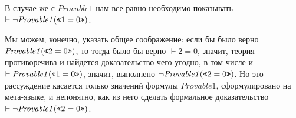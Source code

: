 В случае же с $\mathit{Provable1}$ нам все равно необходимо показывать $\vdash \neg \mathit{Provable1} (\texttt{<<}1=0\texttt{>>})$.

Мы можем, конечно, указать общее соображение: если бы было верно $\mathit{Provable1} (\texttt{<<}2=0\texttt{>>})$, то 
тогда было бы верно $\vdash 2=0$, значит, теория противоречива и найдется доказательство чего угодно, 
в том числе и $\vdash \mathit{Provable1} (\texttt{<<}1=0\texttt{>>})$, значит, выполнено $\neg \mathit{Provable1} (\texttt{<<}2=0\texttt{>>})$.
Но это рассуждение касается только значений формулы $\mathit{Provable1}$, сформулировано на мета-языке, 
и непонятно, как из него сделать формальное доказательство $\vdash \neg \mathit{Provable1} (\texttt{<<}2=0\texttt{>>})$.

